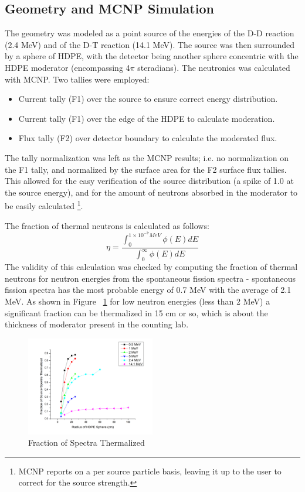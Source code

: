 \documentclass[draftcls,onecolumn]{IEEEtran}
\begin{document}
\subsection{Geometry and MCNP Simulation}
The geometry was modeled as a point source of the energies of the D-D reaction (2.4 MeV) and of the D-T reaction (14.1 MeV).
The source was then surrounded by a sphere of HDPE, with the detector being another sphere concentric with the HDPE moderator (encompassing 4$\pi$ steradians).
The neutronics was calculated with MCNP. Two tallies were employed:
\begin{itemize}
    \item Current tally (F1) over the source to ensure correct energy distribution.
    \item Current tally (F1) over the edge of the HDPE to calculate moderation.
    \item Flux tally (F2) over detector boundary to calculate the moderated flux.
\end{itemize}
The tally normalization was left as the MCNP results; i.e. no normalization on the F1 tally, and normalized by the surface area for the F2 surface flux tallies.
This allowed for the easy verification of the source distribution (a spike of 1.0 at the source energy), and for the amount of neutrons absorbed in the moderator to be easily calculated \footnote{MCNP reports on a per source particle basis, leaving it up to the user to correct for the source strength.}.

The fraction of  thermal neutrons is calculated as follows:
\begin{equation}
\eta = \frac{\int_{0}^{1\times10^{-7} MeV} \phi(E)dE}{\int_0^{\infty}\phi(E)dE}
\end{equation}
The validity of this calculation was checked by computing the fraction of thermal neutrons for neutron energies from the  spontaneous fission spectra -  spontaneous fission spectra has the most probable energy of 0.7 MeV with the average of 2.1 MeV.
As shown in Figure ~\ref{fig:FractionThermalized} for low neutron energies (less than 2 MeV) a significant fraction can be thermalized in 15 cm or so, which is about the thickness of moderator present in the counting lab.
\begin{figure}[ht]
	\centering
\includegraphics[width=0.5\textwidth]{FractionThermalized_EDep}
\caption{Fraction of Spectra Thermalized}
\label{fig:FractionThermalized}
\end{figure}
\end{document}
